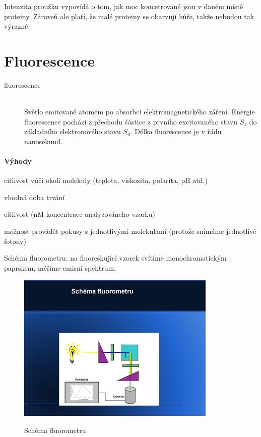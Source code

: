 \documentclass[DIV=8]{scrreprt}
\begin{document}
Intenzita proužku vypovídá o tom, jak moc koncetrované jsou v daném místě proteiny. Zároveň ale platí, že malé proteiny se obarvují hůře, takže nebudou tak výrazné.

\section{Fluorescence} \label{Fluorescence} \FloatBarrier


\begin{description}
\item[fluorescence]\hfill \\
Světlo emitované atomem po absorbci elektromagnetického záření. Energie fluorescence pochází z přechodu částice z prvního excitovaného stavu \(S_1\) do základního elektronového stavu \(S_0\). Délka fluorescence je v řádu nanosekund.

\end{description}


\paragraph{Výhody}
\begin{myItemize}[nosep]
    \item citlivost vůči okolí molekuly (teplota, viskozita, polarita, pH atd.)
    \item vhodná doba trvání
    \item citlivost (nM koncentrace analyzováneho vzorku)
    \item možnost provádět pokusy s jednotlivými molekulami (protože snímáme jednotlivé fotony)
\end{myItemize}



Schéma fluorometru: na fluoreskující vzorek svítíme monochromatickým paprskem, měříme emisní spektrum.

\begin{figure}
    \caption{Schéma fluorometru}
    \includegraphics[width=0.85\textwidth]{slides-2/slide-61.jpg}
    \centering
    \label{}
\end{figure}
\end{document}
